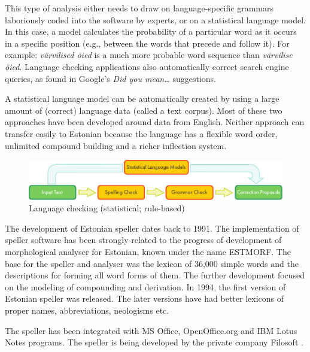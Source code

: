\begin{multicols}{2}
This type of analysis either needs to draw on language-specific grammars laboriously coded into the software by experts, or on a statistical language model. 
In this case, a model calculates the probability of a particular word as it occurs in a specific position (e.g., between the words that precede and follow it). 
For example: \textit{värvilised õied} is a much more probable word sequence than \textit{värvilise õied}.
Language checking applications also automatically correct search engine queries, as found in Google's \textit{Did you mean…} suggestions.

A statistical language model can be automatically created by using a large amount of (correct) language data (called a text corpus). 
Most of these two approaches have been developed around data from English. 
Neither approach can transfer easily to Estonian because the language has a flexible word order, unlimited compound building and a richer inflection system. 

\begin{figure}[htb]
  \center
  \includegraphics[width=\textwidth]{../_media/english/language_checking}
  \caption{Language checking (statistical; rule-based)}
  \label{fig:langcheckingaarch_en}
\end{figure}


The development of Estonian speller dates back to 1991. 
The implementation of speller software has been strongly related to the progress of development of morphological analyser for Estonian, known under the name ESTMORF. 
The base for the speller and analyser was the lexicon of 36,000 simple words and the descriptions for forming all word forms of them. 
The further development focused on the modeling of compounding and derivation.
In 1994, the first version of Estonian speller was released. 
The later versions have had better lexicons of proper names, abbreviations, neologisms etc.

The speller has been integrated with MS Office, OpenOffice.org and IBM Lotus Notes programs. The speller is being developed by the private company Filosoft \cite{Filosoft}.


\end{multicols}
